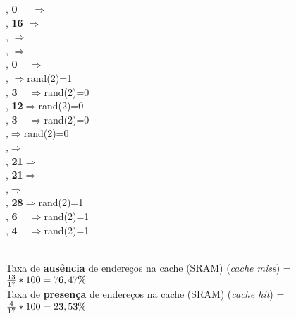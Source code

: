 \begin{tabbing}
\cache{\Lambda}{\Lambda}{\Lambda}{\Lambda}, \hspace{5cm}\= {\bf 0\ \ } $\Rightarrow$\miss\hspace{1.5cm}\=\\
,\> {\bf 16} $\Rightarrow$\miss\\
, $\Rightarrow$\miss\\
, $\Rightarrow$ \HIT \\
 ,\> {\bf 0\ \ }$\Rightarrow$ \HIT \\
 , $\Rightarrow$\miss \>rand(2)=1\\
,\> {\bf 3\ \ }$\Rightarrow$\miss \>rand(2)=0\\
,\> {\bf 12}$\Rightarrow$\miss \>rand(2)=0\\
,\> {\bf 3\ \ }$\Rightarrow$\miss \>rand(2)=0\\
,$\Rightarrow$\miss\>rand(2)=0\\
,$\Rightarrow$\HIT\\
,\> {\bf 21}$\Rightarrow$\miss\\
,\> {\bf 21}$\Rightarrow$\HIT\\
,$\Rightarrow$\miss\\
,\> {\bf 28}$\Rightarrow$\miss \>rand(2)=1\\
,\> {\bf 6\ \ }$\Rightarrow$\miss \>rand(2)=1\\
,\> {\bf 4\ \ }$\Rightarrow$\miss \>rand(2)=1\\
\\
\end{tabbing}


Taxa de {\bf ausência} de endereços na cache (SRAM) ({\em cache miss}) =
${13 \over 17} * 100 = 76,47\%$ \\

Taxa de {\bf presença} de endereços na cache (SRAM) ({\em cache hit}) = ${4
  \over 17} * 100 = 23,53\%$


